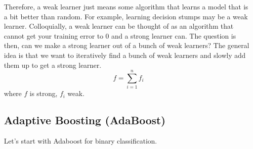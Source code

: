 \documentclass{article}
\begin{document}
    Therefore, a weak learner just means some algorithm that learns a model that is a bit better than random. For example, learning decision stumps may be a weak learner. Colloquially, a weak learner can be thought of as an algorithm that cannot get your training error to $0$ and a strong learner can. The question is then, can we make a strong learner out of a bunch of weak learners? The general idea is that we want to iteratively find a bunch of weak learners and slowly add them up to get a strong learner. 
    \begin{equation}
      f = \sum_{i=1}^n f_i
    \end{equation}
    where $f$ is strong, $f_i$ weak. 

  \subsection{Adaptive Boosting (AdaBoost)} 

    Let's start with Adaboost for binary classification. 
\end{document}
